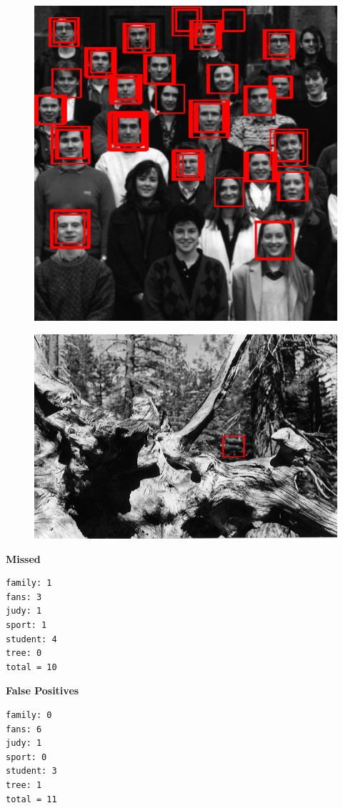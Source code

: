 \documentclass[]{article}
\begin{document}
\begin{figure}[ht]
	\centering
	\includegraphics{students.png}
	\label{fig:students}
\end{figure}
\begin{figure}[ht]
	\centering
	\includegraphics{tree.png}
	\label{fig:tree}
\end{figure}


\textbf{Missed}
\begin{verbatim}
family: 1
fans: 3
judy: 1
sport: 1
student: 4
tree: 0
total = 10
\end{verbatim}

\textbf{False Positives}
\begin{verbatim}
family: 0
fans: 6
judy: 1
sport: 0
student: 3
tree: 1
total = 11
\end{verbatim}
\end{document}
